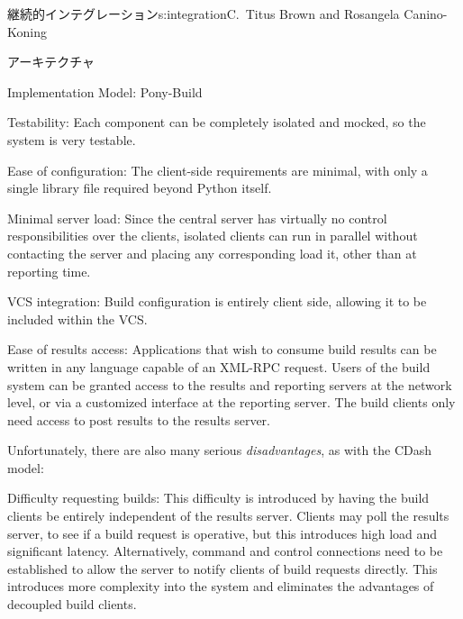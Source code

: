 \begin{aosachapter}{継続的インテグレーション}{s:integration}{C.\ Titus Brown and Rosangela Canino-Koning}
\begin{aosasect1}{アーキテクチャ}
\begin{aosasect2}{Implementation Model: Pony-Build}
\begin{aosadescription}
  \item{Testability:} Each component can be completely isolated
  and mocked, so the system is very testable.

  \item{Ease of configuration:} The client-side requirements are
  minimal, with only a single library file required beyond Python
  itself.

  \item{Minimal server load:} Since the central server has
  virtually no control responsibilities over the clients, isolated
  clients can run in parallel without contacting the server and
  placing any corresponding load it, other than at reporting time.

  \item{VCS integration:} Build configuration is entirely client
  side, allowing it to be included within the VCS.

  \item{Ease of results access:} Applications that wish to
  consume build results can be written in any language capable of an
  XML-RPC request. Users of the build system can be granted access
  to the results and reporting servers at the network level, or via
  a customized interface at the reporting server. The build clients
  only need access to post results to the results server.

\end{aosadescription}

Unfortunately, there are also many serious \emph{disadvantages}, as
with the CDash model:

\begin{aosadescription}

  \item{Difficulty requesting builds:} This difficulty is
  introduced by having the build clients be entirely independent of
  the results server. Clients may poll the results server, to see if
  a build request is operative, but this introduces high load and
  significant latency. Alternatively, command and control
  connections need to be established to allow the server to notify
  clients of build requests directly. This introduces more
  complexity into the system and eliminates the advantages of
  decoupled build clients.


\end{aosadescription}
\end{aosasect2}
\end{aosasect1}
\end{aosachapter}
